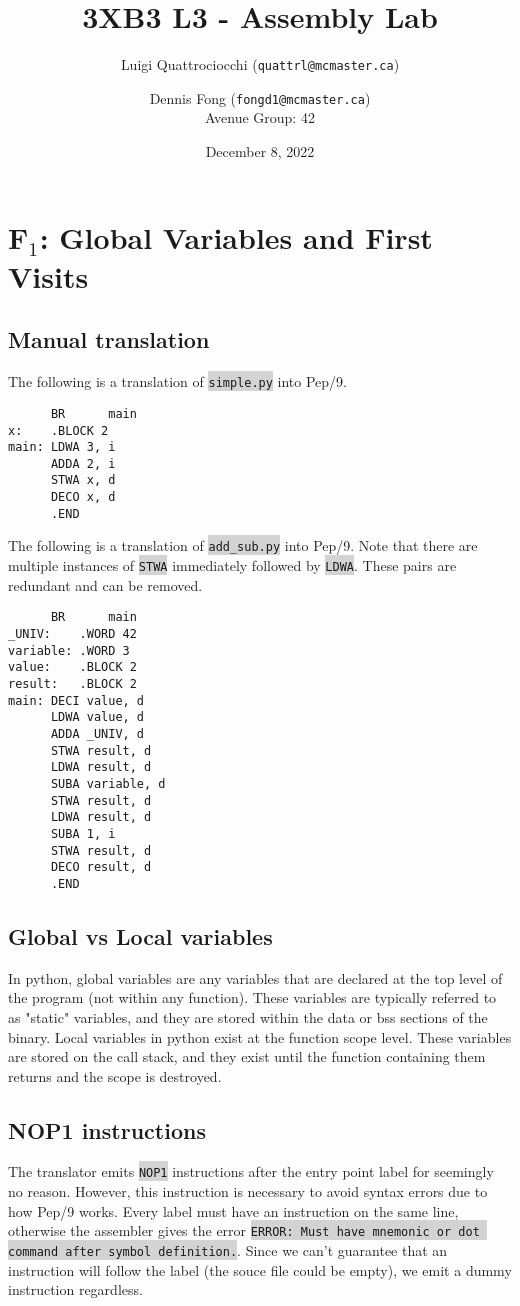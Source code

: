 \documentclass[12pt]{article}
\title{3XB3 L3 - Assembly Lab}
\author{Luigi Quattrociocchi (\texttt{quattrl@mcmaster.ca}) \and
\vspace{0.4cm}Dennis Fong (\texttt{fongd1@mcmaster.ca})\\
Avenue Group: 42}
\date{December 8, 2022}
\newcommand{\code}[1]{\colorbox{LightGray}{\texttt{#1}}}
\begin{document}
\thispagestyle{empty}
\maketitle
\clearpage

\section*{F$_1$: Global Variables and First Visits}
\subsection*{Manual translation}
The following is a translation of \code{simple.py} into Pep/9.
\begin{verbatim}
      BR      main
x:    .BLOCK 2
main: LDWA 3, i
      ADDA 2, i
      STWA x, d
      DECO x, d
      .END
\end{verbatim}
The following is a translation of \code{add\_sub.py} into Pep/9. Note that there are multiple instances of \code{STWA} immediately followed by \code{LDWA}. These pairs are redundant and can be removed.
\begin{verbatim}
      BR      main
_UNIV:    .WORD 42
variable: .WORD 3
value:    .BLOCK 2
result:   .BLOCK 2
main: DECI value, d
      LDWA value, d
      ADDA _UNIV, d
      STWA result, d
      LDWA result, d
      SUBA variable, d
      STWA result, d
      LDWA result, d
      SUBA 1, i
      STWA result, d
      DECO result, d
      .END
\end{verbatim}
\subsection*{Global vs Local variables}
In python, global variables are any variables that are declared at the top level of the program (not within any function). These variables are typically referred to as "static" variables, and they are stored within the data or bss sections of the binary. Local variables in python exist at the function scope level. These variables are stored on the call stack, and they exist until the function containing them returns and the scope is destroyed.

\subsection*{NOP1 instructions}
The translator emits \code{NOP1} instructions after the entry point label for seemingly no reason. However, this instruction is necessary to avoid syntax errors due to how Pep/9 works. Every label must have an instruction on the same line, otherwise the assembler gives the error \code{ERROR: Must have mnemonic or dot command after symbol definition.}. Since we can't guarantee that an instruction will follow the label (the souce file could be empty), we emit a dummy instruction regardless.
\end{document}
